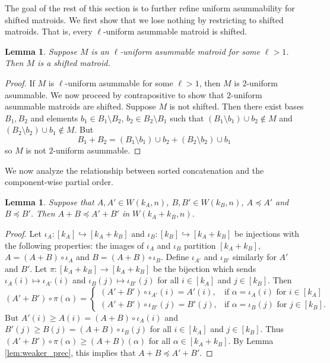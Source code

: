 \documentclass{amsart}
\theoremstyle{definition}
\theoremstyle{plain}
\newtheorem{lemma}[defn]{Lemma}
\begin{document}
The goal of the rest of this section is to further refine uniform asummability for shifted matroids. We first show that we lose nothing by restricting to shifted matroids. That is, every $\ell$-uniform asummable matroid is shifted.

\begin{lemma}
  \label{lem:assum->shifted}
Suppose $M$ is an $\ell$-uniform asummable matroid for some $\ell>1$. Then $M$ is a shifted matroid.
\end{lemma}
\begin{proof}
  If $M$ is $\ell$-uniform asummable for some $\ell>1$, then $M$ is $2$-uniform asummable. We now proceed by contrapositive to show that $2$-uniform asummable matroids are shifted. Suppose $M$ is not shifted. Then there exist bases $B_1,B_2$ and elements $b_1\in B_1\setminus B_2$, $b_2\in B_2\setminus B_1$ such that $(B_1\setminus b_1)\cup b_2\not\in M$ and $(B_2\setminus b_2)\cup b_1 \not\in M$. But
  \[B_1+B_2 = (B_1\setminus b_1)\cup b_2 +(B_2\setminus b_2)\cup b_1 \]
  so $M$ is not $2$-uniform asummable. 
\end{proof}

We now analyze the relationship between sorted concatenation and the component-wise partial order.

\begin{lemma}\label{lem:prec_conc}
Suppose that $A,A'\in W(k_A,n)$, $B,B'\in W(k_B,n)$, $A\preceq A'$ and $B\preceq B'$. Then $A+B\preceq A'+B'$ in $W(k_A+k_B,n)$. 
\end{lemma}
\begin{proof}
  Let $\iota_A:[k_A]\hookrightarrow [k_A+k_B]$ and $\iota_B:[k_B]\hookrightarrow [k_A+k_B]$ be injections with the following properties: the images of $\iota_A$ and $\iota_B$ partition $[k_A+k_B]$, $A=(A+B)\circ\iota_A$ and $B=(A+B)\circ\iota_B$. Define $\iota_{A'}$ and $\iota_{B'}$ similarly for $A'$ and $B'$. Let $\pi:[k_A+k_B]\to [k_A+k_B]$ be the bijection which sends $\iota_{A}(i)\mapsto \iota_{A'}(i)$ and $\iota_{B}(j)\mapsto \iota_{B'}(j)$ for all $i\in[k_A]$ and $j\in[k_B]$. Then
  \[(A'+B')\circ\pi(\alpha) = \begin{cases}
                       (A'+B')\circ \iota_{A'}(i) = {A'}(i), & \text{if $\alpha=\iota_A(i)$ for $i\in[k_A]$}\\
                       (A'+B')\circ \iota_{B'}(j) = {B'}(j), & \text{if $\alpha=\iota_B(j)$ for $j\in[k_B]$.}
                     \end{cases}\]
But ${A'}(i)\geq A(i)=(A+B)\circ\iota_A(i)$ and ${B'}(j)\geq B(j)=(A+B)\circ\iota_B(j)$ for all $i\in[k_A]$ and $j\in[k_B]$. Thus $(A'+B')\circ \pi(\alpha)\geq (A+B)(\alpha)$ for all $\alpha\in[k_A+k_B]$. By Lemma \ref{lem:weaker_prec}, this implies that $A+B\preceq A'+B'$.
\end{proof}
\end{document}
